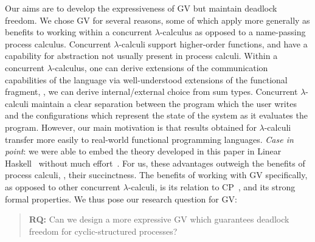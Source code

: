 \documentclass[main.tex]{subfiles}
\begin{document}
Our aims are to develop the expressiveness of GV but maintain deadlock freedom. We chose GV for several reasons, some of which apply more generally as benefits to working within a concurrent $\lambda$-calculus as opposed to a name-passing process calculus. Concurrent $\lambda$-calculi support higher-order functions, and have a capability for abstraction not usually present in process calculi. Within a concurrent $\lambda$-calculus, one can derive extensions of the communication capabilities of the language via well-understood extensions of the functional fragment, \eg, we can derive internal/external choice from sum types. Concurrent $\lambda$-calculi maintain a clear separation between the program which the user writes and the configurations which represent the state of the system as it evaluates the program. However, our main motivation is that results obtained for $\lambda$-calculi transfer more easily to real-world functional programming languages. \emph{Case in point}: we were able to embed the theory developed in this paper in Linear Haskell~\cite{bernardyboespflug18} without much effort~\cite{kokkedardha21hs}. For us, these advantages outweigh the benefits of process calculi, \eg, their succinctness.
The benefits of working with GV specifically, as opposed to other concurrent $\lambda$-calculi, is its relation to CP~\cite{wadler14}, and its strong formal properties. We thus pose our research question for GV:
\begin{quotation}
  \textbf{RQ:}
  Can we design a more expressive GV which guarantees deadlock freedom for cyclic-structured processes?
\end{quotation}
\end{document}
